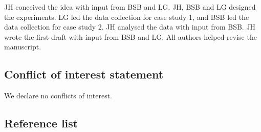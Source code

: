 \documentclass[
  letterpaper,
  DIV=11,
  numbers=noendperiod]{scrartcl}
\begin{document}
JH conceived the idea with input from BSB and LG. JH, BSB and LG
designed the experiments. LG led the data collection for case study 1,
and BSB led the data collection for case study 2. JH analysed the data
with input from BSB. JH wrote the first draft with input from BSB and
LG. All authors helped revise the manuscript.

\subsection{Conflict of interest
statement}\label{conflict-of-interest-statement}

We declare no conflicts of interest.

\subsection{Reference list}\label{reference-list}
\end{document}
